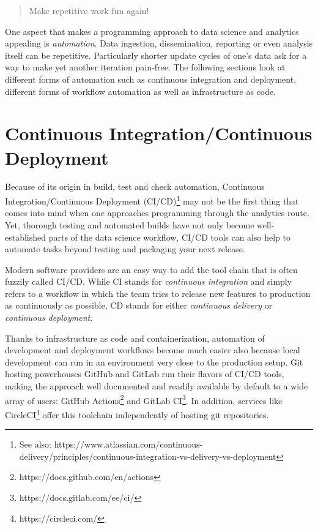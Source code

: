 \documentclass[
  12pt,
  letterpaper,
]{krantz}
\begin{document}
\begin{quote}
Make repetitive work fun again!
\end{quote}

One aspect that makes a programming approach to data science and
analytics appealing is \emph{automation}. Data
ingestion, dissemination, reporting or even analysis itself can be
repetitive. Particularly shorter update cycles of one's data ask for a
way to make yet another iteration pain-free. The following sections look
at different forms of automation such as continuous
integration and deployment, different forms of workflow
automation as well as
infrastructure as code.

\hypertarget{continuous-integrationcontinuous-deployment}{%
\section{Continuous Integration/Continuous
Deployment}\label{continuous-integrationcontinuous-deployment}}

Because of its origin in build, test and check
automation, Continuous Integration/Continuous
Deployment (CI/CD)\footnote{See also:
  https://www.atlassian.com/continuous-delivery/principles/continuous-integration-vs-delivery-vs-deployment}
may not be the first thing that comes into mind when one approaches
programming through the analytics route. Yet, thorough testing and
automated builds have not only become well-established parts of the data
science workflow, CI/CD tools can also help to automate
tasks beyond testing and packaging your next release.

Modern  software providers are an easy way to add
the tool chain that is often fuzzily called CI/CD. While CI
stands for \emph{continuous integration} and simply refers to a workflow
in which the team tries to release new features to production as
continuously as possible, CD stands for either \emph{continuous
delivery} or \emph{continuous deployment}.

Thanks to infrastructure as code and
containerization, automation
of development and deployment workflows become much easier also because
local development can run in an environment very close to the production
setup. Git hosting powerhouses GitHub and
GitLab run their flavors of CI/CD tools,
making the approach well documented and readily available by default to
a wide array of users: GitHub Actions\footnote{https://docs.github.com/en/actions}
and GitLab CI\footnote{https://docs.gitlab.com/ee/ci/}. In addition,
services like CircleCI\footnote{https://circleci.com/} offer this
toolchain independently of hosting git repositories.
\end{document}
